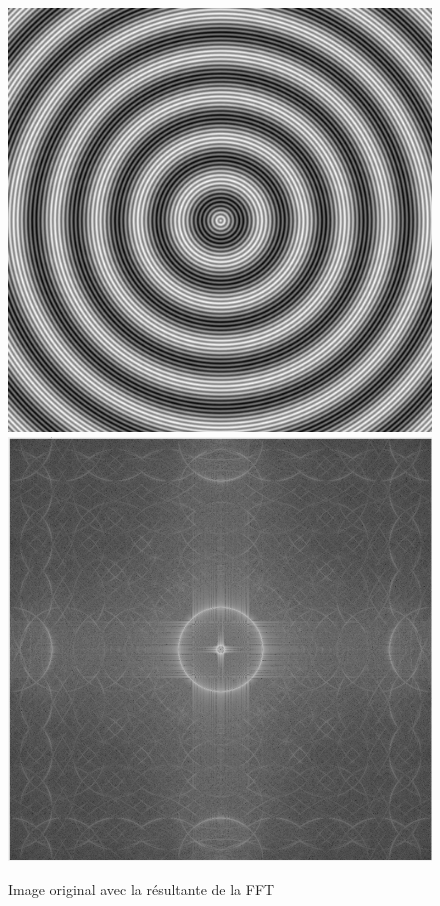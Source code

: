 \documentclass[a4paper,12pt]{report}
\begin{document}
\begin{figure}[!ht]
	\center	\includegraphics[scale=0.15]{image/1024_moire.jpg}	\includegraphics[scale=0.2]{image/q1_FFT_original.png}
	\caption{Image original avec la résultante de la FFT}
\end{figure}
\end{document}
